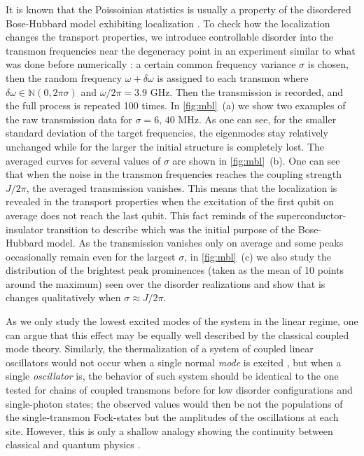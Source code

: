 \documentclass[%
 aps, prl,
 amsmath,amssymb,
 reprint,%
superscriptaddress
]{revtex4-2}
\begin{document}
It is known that the Poissoinian statistics is usually a property of the disordered Bose-Hubbard model exhibiting localization \cite{roushan2017spectroscopic, Yan2019,Ye2019}. To check how the localization changes the transport properties, we introduce controllable disorder into the transmon frequencies near the degeneracy point in an experiment similar to what was done before numerically \cite{orell2019probing}: a certain common frequency variance $\sigma$ is chosen, then the random frequency $\omega + \delta \omega$ is assigned to each transmon where $\delta\omega \in \mathbb N(0,2\pi\sigma)$ and $\omega/2\pi = 3.9$ GHz. Then the transmission is recorded, and the full process is repeated 100 times. 
In \autoref{fig:mbl}~(a) we show two examples of the raw transmission data for  $\sigma = 6,\, 40$ MHz. As one can see, for the smaller standard deviation of the target frequencies, the eigenmodes stay relatively unchanged while for the larger the initial structure is completely lost. The averaged curves for several values of $\sigma$ are shown in \autoref{fig:mbl}~(b). One can see that when the noise in the transmon frequencies reaches the coupling strength $J/2\pi$, the averaged transmission vanishes. This means that the localization is revealed in the transport properties when the excitation of the first qubit on average does not reach the last qubit. This fact reminds of the superconductor-insulator transition \cite{bruder1993superconductor} to describe which was the initial purpose of the Bose-Hubbard model. As the transmission vanishes only on average and some peaks occasionally remain even for the largest $\sigma$, in \autoref{fig:mbl}~(c) we also study the distribution of the brightest peak prominences (taken as the mean of 10 points around the maximum) seen over the disorder realizations and show that is changes qualitatively when $\sigma \approx J/2\pi$.  

As we only study the lowest excited modes of the system in the linear regime, one can argue that this effect may be equally well described by the classical coupled mode theory. Similarly, the thermalization of a system of coupled linear oscillators would not occur when a single normal \textit{mode} is excited \cite{deutsch2018eigenstate}, but when a single \textit{oscillator} is, the behavior of such system should be identical to the one tested for chains of coupled transmons before \cite{Yan2019, ma2019dissipatively} for low disorder configurations and single-photon states; the observed values would then be not the populations of the single-transmon Fock-states but the amplitudes of the oscillations at each site. However, this is only a shallow analogy showing the continuity between classical and quantum physics \cite{park2012classical}.
\end{document}
